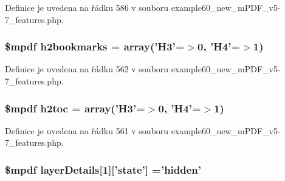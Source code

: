 Definice je uvedena na řádku 586 v souboru example60\-\_\-new\-\_\-m\-P\-D\-F\-\_\-v5-\/7\-\_\-features.\-php.

\hypertarget{example60__new__m_p_d_f__v5-7__features_8php_afb14621f469d666ef1cfb8cac3de8764}{
\subsubsection[{h2bookmarks}]{\setlength{\rightskip}{0pt plus 5cm}\$mpdf h2bookmarks = array('H3'=$>$0, 'H4'=$>$1)}}\label{example60__new__m_p_d_f__v5-7__features_8php_afb14621f469d666ef1cfb8cac3de8764}


Definice je uvedena na řádku 562 v souboru example60\-\_\-new\-\_\-m\-P\-D\-F\-\_\-v5-\/7\-\_\-features.\-php.

\hypertarget{example60__new__m_p_d_f__v5-7__features_8php_aac5f519d93d5cc4e570c04f67028b10e}{
\subsubsection[{h2toc}]{\setlength{\rightskip}{0pt plus 5cm}\$mpdf h2toc = array('H3'=$>$0, 'H4'=$>$1)}}\label{example60__new__m_p_d_f__v5-7__features_8php_aac5f519d93d5cc4e570c04f67028b10e}


Definice je uvedena na řádku 561 v souboru example60\-\_\-new\-\_\-m\-P\-D\-F\-\_\-v5-\/7\-\_\-features.\-php.

\hypertarget{example60__new__m_p_d_f__v5-7__features_8php_a43d3ff8bf1b5cd7b05ce15303446ad98}{
\subsubsection[{layer\-Details}]{\setlength{\rightskip}{0pt plus 5cm}\$mpdf layer\-Details\mbox{[}1\mbox{]}\mbox{[}'state'\mbox{]} ='hidden'}}\label{example60__new__m_p_d_f__v5-7__features_8php_a43d3ff8bf1b5cd7b05ce15303446ad98}


